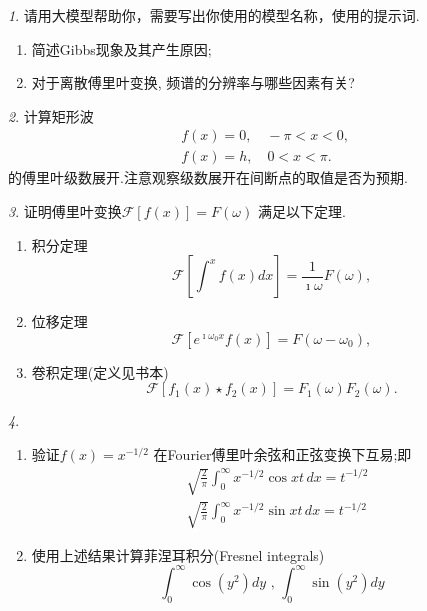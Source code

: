 \documentclass[11pt]{article}
\theoremstyle{remark}
\newtheorem{problem}{}
\begin{document}
\renewcommand{\labelenumi}{(\arabic{enumi})}
\renewcommand{\labelenumii}{(\arabic{enumi}.\arabic{enumii})}

\begin{problem}
    请用大模型帮助你，需要写出你使用的模型名称，使用的提示词.
    \begin{enumerate}
        \item 简述Gibbs现象及其产生原因;
        \item 对于离散傅里叶变换, 频谱的分辨率与哪些因素有关?
    \end{enumerate}
\end{problem}


\begin{problem}
计算矩形波$$
\begin{aligned}
& f(x)=0, \quad-\pi<x<0, \\
& f(x)=h, \quad 0<x<\pi .
\end{aligned}
$$
的傅里叶级数展开.注意观察级数展开在间断点的取值是否为预期.
\end{problem}
  
\begin{problem}
    证明傅里叶变换$\mathcal{F}[f(x)] = F(\omega)$ 满足以下定理.
    \begin{enumerate}
      
        \item 积分定理
        $$
            \mathcal{F} [ \int^{x} f(x) dx ] = \frac{1}{\imath \omega} F(\omega),
        $$
        \item 位移定理
        $$
            \mathcal{F} [ e^{\imath \omega_0 x} f(x) ] = F(\omega - \omega_0),
        $$
        \item 卷积定理(定义见书本)
        $$
            \mathcal{F} [f_1(x)\star f_2(x) ] = F_1(\omega) F_2(\omega).
        $$
      \end{enumerate}
\end{problem}


  
\begin{problem}
    \begin{enumerate}
        \item 验证$f(x)=x^{-1 / 2}$ 在Fourier傅里叶余弦和正弦变换下互易;即
        $$
        \begin{aligned}
        & \sqrt{\frac{2}{\pi}} \int_0^{\infty} x^{-1 / 2} \cos {x t} \, dx=t^{-1 / 2} \\
        & \sqrt{\frac{2}{\pi}} \int_0^{\infty} x^{-1 / 2} \sin {x t} \, dx=t^{-1 / 2}
        \end{aligned}
        $$
        \item 使用上述结果计算菲涅耳积分(Fresnel integrals)
        $$
        \int_0^{\infty} \cos \left(y^2\right) d y \text { , } \int_0^{\infty} \sin \left(y^2\right) d y
        $$
      \end{enumerate}
\end{problem}
    
\end{document}
